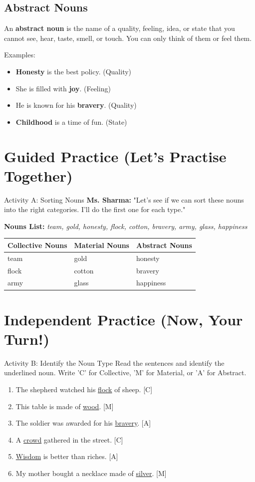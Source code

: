 \subsection{Abstract Nouns}
An \textbf{abstract noun} is the name of a quality, feeling, idea, or state that you cannot see, hear, taste, smell, or touch. You can only think of them or feel them.

Examples:
\begin{itemize}
    \item \textbf{Honesty} is the best policy. (Quality)
    \item She is filled with \textbf{joy}. (Feeling)
    \item He is known for his \textbf{bravery}. (Quality)
    \item \textbf{Childhood} is a time of fun. (State)
\end{itemize}

\section{Guided Practice (Let's Practise Together)}
\begin{activitybox}{Activity A: Sorting Nouns}
\textbf{Ms. Sharma:} "Let's see if we can sort these nouns into the right categories. I'll do the first one for each type."

\textbf{Nouns List:} \textit{team, gold, honesty, flock, cotton, bravery, army, glass, happiness}

\begin{tabular}{|l|l|l|}
\hline
\textbf{Collective Nouns} & \textbf{Material Nouns} & \textbf{Abstract Nouns} \\
\hline
team & gold & honesty \\
flock & cotton & bravery \\
army & glass & happiness \\
\hline
\end{tabular}
\end{activitybox}

\section{Independent Practice (Now, Your Turn!)}
\begin{activitybox}{Activity B: Identify the Noun Type}
Read the sentences and identify the underlined noun. Write 'C' for Collective, 'M' for Material, or 'A' for Abstract.
\begin{enumerate}
    \item The shepherd watched his \underline{flock} of sheep. [C]
    \item This table is made of \underline{wood}. [M]
    \item The soldier was awarded for his \underline{bravery}. [A]
    \item A \underline{crowd} gathered in the street. [C]
    \item \underline{Wisdom} is better than riches. [A]
    \item My mother bought a necklace made of \underline{silver}. [M]
\end{enumerate}
\end{activitybox}

